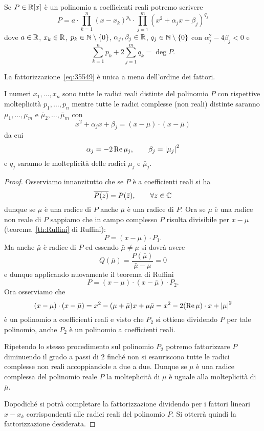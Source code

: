 \begin{theorem}
  \label{th:fattorizzazione_polinomio_reale}%
Se $P\in \mathbb R[x]$ è un polinomio a coefficienti reali
potremo scrivere
\begin{equation}\label{eq:35549}
  P = a \cdot \prod_{k=1}^n (x-x_k)^{p_k} \cdot \prod_{j=1}^m (x^2 + \alpha_j x + \beta_j)^{q_j}
\end{equation}
dove $a\in \mathbb R$, $x_k\in \mathbb R$, $p_k\in \mathbb N\setminus{\left\{ 0 \right\}}$,
$\alpha_j,\beta_j\in \mathbb R$, $q_j\in \mathbb N\setminus{\left\{ 0 \right\}}$
con $\alpha_j^2 - 4 \beta_j < 0$
e
\[
  \sum_{k=1}^n p_k + 2 \sum_{j=1}^m q_k = \deg P.
\]

La fattorizzazione~\eqref{eq:35549} è unica a meno
dell'ordine dei fattori.

I numeri $x_1,\dots,x_n$ sono tutte le radici reali distinte
del polinomio $P$ con rispettive molteplicità
$p_1,\dots,p_n$ mentre tutte le radici complesse (non reali)
distinte saranno $\mu_1,\dots, \mu_m$
e $\bar \mu_2, \dots, \bar \mu_m$ con
\[
  x^2 + \alpha_j x + \beta_j = (x-\mu)\cdot(x-\bar \mu)
\]
da cui
\[
  \alpha_j = -2\operatorname{Re} \mu_j, \qquad \beta_j={\left|\mu_j\right|}^2
\]
e $q_j$ saranno le molteplicità delle radici $\mu_j$
 e $\bar \mu_j$.
\end{theorem}
%
\begin{proof}
Osserviamo innanzitutto che se $P$ è a coefficienti reali
si ha
\[
  \overline{P(z)} = P(\bar z), \qquad \forall z\in \mathbb C
\]
dunque se $\mu$ è una radice di $P$ anche $\bar \mu$
è una radice di $P$.
Ora se $\mu$ è una radice non reale di $P$ sappiamo
che in campo complesso $P$ risulta divisibile
per $x-\mu$ (teorema~\ref{th:Ruffini} di Ruffini):
\[
  P = (x-\mu) \cdot P_1.
\]
Ma anche $\bar \mu$ è radice di $P$ ed essendo
$\bar \mu \neq \mu$ si dovrà avere
\[
Q(\bar \mu) = \frac{P(\bar \mu)}{\bar \mu - \mu} = 0
\]
e dunque applicando nuovamente il teorema di Ruffini
\[
 P = (x-\mu)\cdot (x-\bar \mu)\cdot P_2.
\]
Ora osserviamo che
\[
(x-\mu)\cdot(x-\bar \mu) = x^2 - (\mu + \bar \mu) x + \mu \bar \mu
 = x^2 - 2 (\operatorname{Re} \mu)\cdot x + {\left|\mu\right|}^2
\]
è un polinomio a coefficienti reali e
visto che $P_2$ si ottiene dividendo $P$ per tale polinomio,
anche $P_2$ è un polinomio a coefficienti reali.

Ripetendo lo stesso procedimento sul polinomio $P_2$
potremo fattorizzare $P$ diminuendo il grado a passi
di $2$ finché non si esauriscono tutte le radici complesse
non reali accoppiandole a due a due.
Dunque se $\mu$ è una radice complessa
del polinomio reale $P$ la molteplicità di $\mu$ è
uguale alla molteplicità di $\bar \mu$.

Dopodiché
si potrà completare la fattorizzazione dividendo
per i fattori lineari $x-x_k$ corrispondenti
alle radici reali del polinomio $P$.
Si otterrà quindi la fattorizzazione desiderata.
\end{proof}
